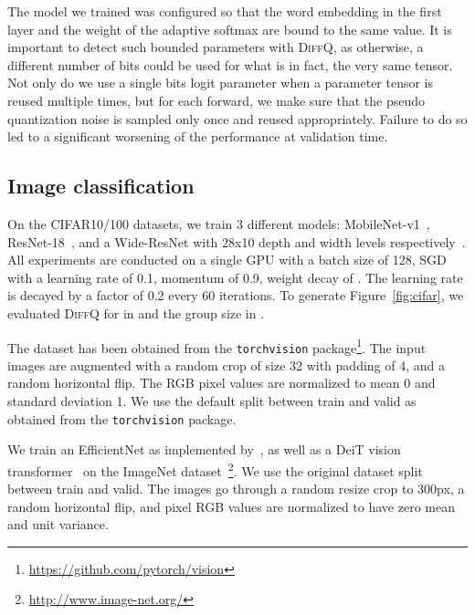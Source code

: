 \documentclass{article}
\newcommand{\diffq}{\textsc{DiffQ}\xspace}
\begin{document}
\noindent{\bf Tied weights and \diffq.}
The model we trained was configured so that the word embedding in the first layer and the weight of the adaptive softmax are bound to the same value. It is important to detect such bounded parameters with \diffq, as otherwise, a different number of bits could be used for what is in fact, the very same tensor. Not only do we use a single bits logit parameter
when a parameter tensor is reused multiple times, but for each forward, we make sure that the pseudo quantization noise
is sampled only once and reused appropriately. Failure to do so led to a significant worsening of the performance
at validation time.

\vspace{-0.2cm}
\subsection{Image classification}
\vspace{-0.1cm}
\label{supp:image}

On the CIFAR10/100 datasets, we train 3 different models: MobileNet-v1~\citep{howard2017mobilenets}, ResNet-18~\citep{he2016deep}, and a Wide-ResNet with 28x10 depth and width levels respectively~\citep{zagoruyko2016wide}.
All experiments are conducted on a single GPU with a batch size of 128, SGD with a learning rate of 0.1, momentum of 0.9,
weight decay of . The learning rate is decayed by a factor of 0.2 every 60 iterations.
To generate Figure~\ref{fig:cifar}, we evaluated \diffq for  in 
and the group size  in .

The dataset has been obtained from the \texttt{torchvision} package\footnote{\url{https://github.com/pytorch/vision}}.
The input images are augmented with a random crop of size 32 with padding of 4, and a random horizontal flip.
The RGB pixel values are normalized to mean 0 and standard deviation 1. We use the default split between
train and valid as obtained from the \texttt{torchvision} package.

We train an EfficientNet as implemented by~\citep{rw2019timm},
as well as a DeiT vision transformer~\citep{touvron2020training}  on the ImageNet dataset~\cite{imagenet_cvpr09}\footnote{\url{http://www.image-net.org/}}. We use the original dataset
split between train and valid. 
The images go through a random resize crop to 300px, a random horizontal flip, and pixel RGB values are normalized
to have zero mean and unit variance.
\end{document}
